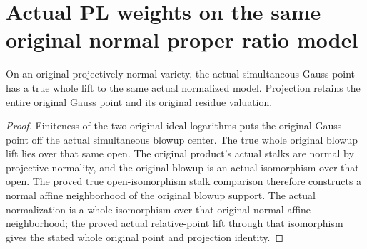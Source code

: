 \section{Actual PL weights on the same original normal proper ratio model}

\begin{definition}
\label{def:actual-original-normalized-simultaneous-gauss-point}
\leanok
{}
On an original projectively normal variety, the actual simultaneous Gauss
point has a true whole lift to the same actual normalized model. Projection
retains the entire original Gauss point and its original residue valuation.
\end{definition}
\begin{proof}
Finiteness of the two original ideal logarithms puts the original Gauss
point off the actual simultaneous blowup center. The true whole original
blowup lift lies over that same open. The original product's actual stalks
are normal by projective normality, and the original blowup is an actual
isomorphism over that open. The proved true open-isomorphism stalk comparison
therefore constructs a normal affine neighborhood of the original blowup
support. The actual normalization is a whole isomorphism over that original
normal affine neighborhood; the proved actual relative-point lift through
that isomorphism gives the stated whole original point and projection identity.
\end{proof}

